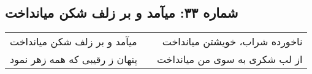 \begin{center}
\section*{شماره ۳۳: میآمد و بر زلف شکن میانداخت}
\label{sec:033}
\begin{longtable}{l p{0.5cm} r}
میآمد و بر زلف شکن میانداخت
&&
ناخورده شراب، خویشتن میانداخت
\\
پنهان ز رقیبی که همه زهر نمود
&&
از لب شکری به سوی من میانداخت
\\
\end{longtable}
\end{center}
